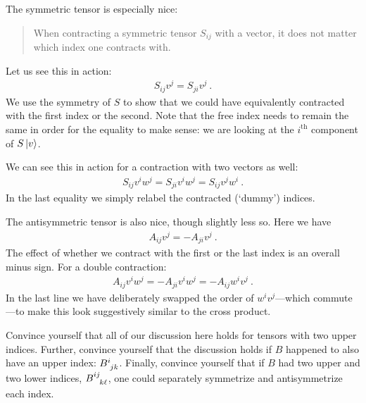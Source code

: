 \documentclass[12pt, oneside]{report}    %
\begin{document}
\begin{subappendices}
The symmetric tensor is especially nice:
\begin{quote}
When contracting a symmetric tensor $S_{ij}$ with a vector, it does not matter which index one contracts with. 
\end{quote}
Let us see this in action:
\begin{align}
    S_{ij}v^j = S_{ji}v^j \ .
\end{align}
We use the symmetry of $S$ to show that we could have equivalently contracted with the first index or the second. Note that the free index needs to remain the same in order for the equality to make sense: we are looking at the $i^\text{th}$ component of $S\left|v\right\rangle$.

We can see this in action for a contraction with two vectors as well:
\begin{align}
    S_{ij}v^iw^j = S_{ji}v^i w^j = S_{ij} v^j w^i \ .
    \label{eq:symmetric:with:two:vectors}
\end{align}
In the last equality we simply relabel the contracted (`dummy') indices.

The antisymmetric tensor is also nice, though slightly less so. Here we have
\begin{align}
    A_{ij}v^j = - A_{ji}v^j \ .
\end{align}
The effect of whether we contract with the first or the last index is an overall minus sign. For a double contraction:
\begin{align}
    A_{ij}v^iw^j = -A_{ji}v^i w^j = -A_{ij} w^i v^j \ .
\end{align}
In the last line we have deliberately swapped the order of $w^i v^j$---which commute---to make this look suggestively similar to the cross product. 





\begin{exercise}
Convince yourself that all of our discussion here holds for tensors with two upper indices. Further, convince yourself that the discussion holds if $B$ happened to also have an upper index: $B\aij{i}{jk}$. Finally, convince yourself that if $B$ had two upper and two lower indices, $B\aij{ij}{k\ell}$, one could separately symmetrize and antisymmetrize each index.
\end{exercise}




\end{subappendices}
\end{document}
